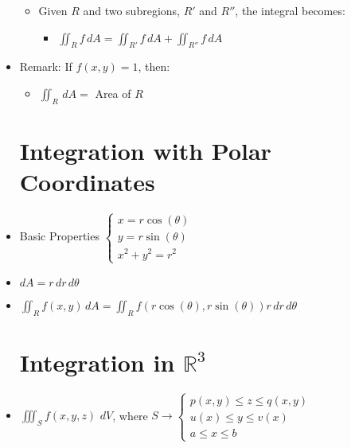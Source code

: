 \begin{itemize}
\begin{itemize}
      \item Given $R$ and two subregions, $R'$ and $R''$, the integral becomes:

        \begin{itemize}

          \item $\displaystyle \iint_R f\,dA = \iint_{R'} f\,dA + \iint_{R''} f\,dA$

        \end{itemize}

    \end{itemize}

  \item Remark: If $f(x,y)=1$, then:

    \begin{itemize}

      \item $\displaystyle \iint_R\,dA =$ Area of $R$

    \end{itemize}

    \section{Integration with Polar Coordinates}

  \item Basic Properties $\left\{\begin{array}{c} x=r\cos(\theta)\\y=r\sin(\theta)\\x^2+y^2=r^2  \end{array}$

  \item $dA = r\,dr\,d\theta$

  \item $\displaystyle \iint_R f(x,y)\,dA=\displaystyle \iint_R f(r\cos(\theta), r\sin(\theta))r\,dr\,d\theta$

    \section{Integration in $\mathbb{R}^3$}

  \item $\displaystyle \iiint_S f(x,y,z)\,\,dV$, where $S\rightarrow\left\{\begin{array}{l} p(x,y) \leq z \leq q(x,y)\\ u(x) \leq y \leq v(x)\\ a \leq x \leq b  \end{array}$


\end{itemize}
